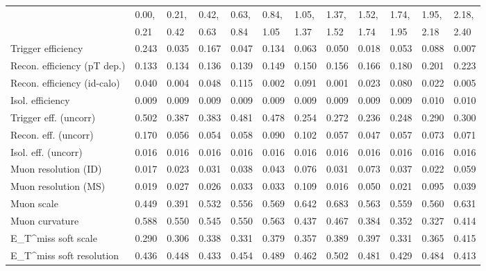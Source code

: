 \begin{tabular}{l|p{0.6cm}p{0.6cm}p{0.6cm}p{0.6cm}p{0.6cm}p{0.6cm}p{0.6cm}p{0.6cm}p{0.6cm}p{0.6cm}p{0.6cm}}
\hline
   & 0.00, & 0.21, & 0.42, & 0.63, & 0.84, & 1.05, & 1.37, & 1.52, & 1.74, & 1.95, & 2.18,  \\ 
   & 0.21 & 0.42 & 0.63 & 0.84 & 1.05 & 1.37 & 1.52 & 1.74 & 1.95 & 2.18 & 2.40  \\ 
\hline
Trigger efficiency                       & 0.243 & 0.035 & 0.167 & 0.047 & 0.134 & 0.063 & 0.050 & 0.018 & 0.053 & 0.088 & 0.007 \\
Recon. efficiency (pT dep.)              & 0.133 & 0.134 & 0.136 & 0.139 & 0.149 & 0.150 & 0.156 & 0.166 & 0.180 & 0.201 & 0.223 \\
Recon. efficiency (id-calo)              & 0.040 & 0.004 & 0.048 & 0.115 & 0.002 & 0.091 & 0.001 & 0.023 & 0.080 & 0.022 & 0.005 \\
Isol. efficiency                         & 0.009 & 0.009 & 0.009 & 0.009 & 0.009 & 0.009 & 0.009 & 0.009 & 0.009 & 0.010 & 0.010 \\
Trigger eff. (uncorr)                    & 0.502 & 0.387 & 0.383 & 0.481 & 0.478 & 0.254 & 0.272 & 0.236 & 0.248 & 0.290 & 0.300 \\
Recon. eff. (uncorr)                     & 0.170 & 0.056 & 0.054 & 0.058 & 0.090 & 0.102 & 0.057 & 0.047 & 0.057 & 0.073 & 0.071 \\
Isol. eff. (uncorr)                      & 0.016 & 0.016 & 0.016 & 0.016 & 0.016 & 0.016 & 0.016 & 0.016 & 0.016 & 0.016 & 0.016 \\
Muon resolution (ID)                     & 0.017 & 0.023 & 0.031 & 0.038 & 0.043 & 0.076 & 0.031 & 0.073 & 0.037 & 0.022 & 0.059 \\
Muon resolution (MS)                     & 0.019 & 0.027 & 0.026 & 0.033 & 0.033 & 0.109 & 0.016 & 0.050 & 0.021 & 0.095 & 0.039 \\
Muon scale                               & 0.449 & 0.391 & 0.532 & 0.556 & 0.569 & 0.642 & 0.683 & 0.563 & 0.559 & 0.560 & 0.631 \\
Muon curvature                           & 0.588 & 0.550 & 0.545 & 0.550 & 0.563 & 0.437 & 0.467 & 0.384 & 0.352 & 0.327 & 0.414 \\
E_{T}^{miss} soft scale                  & 0.290 & 0.306 & 0.338 & 0.331 & 0.379 & 0.357 & 0.389 & 0.397 & 0.331 & 0.365 & 0.415 \\
E_{T}^{miss} soft resolution             & 0.436 & 0.448 & 0.433 & 0.454 & 0.489 & 0.462 & 0.502 & 0.481 & 0.429 & 0.484 & 0.413 \\

\end{tabular}
